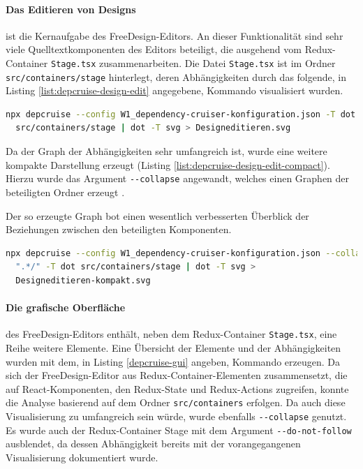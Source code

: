 \paragraph{Das Editieren von Designs} ist die Kernaufgabe des FreeDesign-Editors. 
An dieser Funktionalität sind sehr viele Quelltextkomponenten des Editors beteiligt, die ausgehend vom Redux-Container \lstinline|Stage.tsx| zusammenarbeiten. Die Datei \lstinline|Stage.tsx| ist im Ordner \lstinline|src/containers/stage| hinterlegt, deren Abhängigkeiten durch das folgende, in Listing \ref{list:depcruise-design-edit} angegebene, Kommando visualisiert wurden.
\begin{lstlisting}[language={sh}, label=list:depcruise-design-edit, caption=Visualisierung der Abhängigkeiten für den Quelletext zum Editieren des Designs]
npx depcruise --config W1_dependency-cruiser-konfiguration.json -T dot  
  src/containers/stage | dot -T svg > Designeditieren.svg      
\end{lstlisting}
Da der Graph der Abhängigkeiten sehr umfangreich ist, wurde eine weitere kompakte Darstellung erzeugt (Listing \ref{list:depcruise-design-edit-compact}). Hierzu wurde das Argument \lstinline|--collapse| angewandt, welches einen Graphen der beteiligten Ordner erzeugt \autocite[vgl.][]{Verweij:CLI}. 

Der so erzeugte Graph bot einen wesentlich verbesserten Überblick der Beziehungen zwischen den beteiligten Komponenten.

\begin{lstlisting}[language={sh}, label=list:depcruise-design-edit-compact, caption=Kommando für eine kompakte Visualisierung der Abhängigkeiten von \lstinline|Stage.tsx|]
npx depcruise --config W1_dependency-cruiser-konfiguration.json --collapse 
  ".*/" -T dot src/containers/stage | dot -T svg > 
  Designeditieren-kompakt.svg
\end{lstlisting}

\paragraph{Die grafische Oberfläche} des FreeDesign-Editors
enthält, neben dem Redux-Container \lstinline|Stage.tsx|, eine Reihe weitere Elemente. Eine Übersicht der Elemente und der Abhängigkeiten wurden mit dem, in Listing \ref{depcruise-gui} angeben, Kommando erzeugen. Da sich der FreeDesign-Editor aus Redux-Container-Elementen zusammensetzt, die auf React-Komponenten, den Redux-State und Redux-Actions zugreifen, konnte die Analyse basierend auf dem Ordner \lstinline|src/containers| erfolgen. Da auch diese Visualisierung zu umfangreich sein würde, wurde ebenfalls \lstinline|--collapse| genutzt. Es wurde auch der Redux-Container Stage mit dem Argument \lstinline|--do-not-follow| ausblendet, da dessen Abhängigkeit bereits mit der vorangegangenen Visualisierung dokumentiert wurde.


